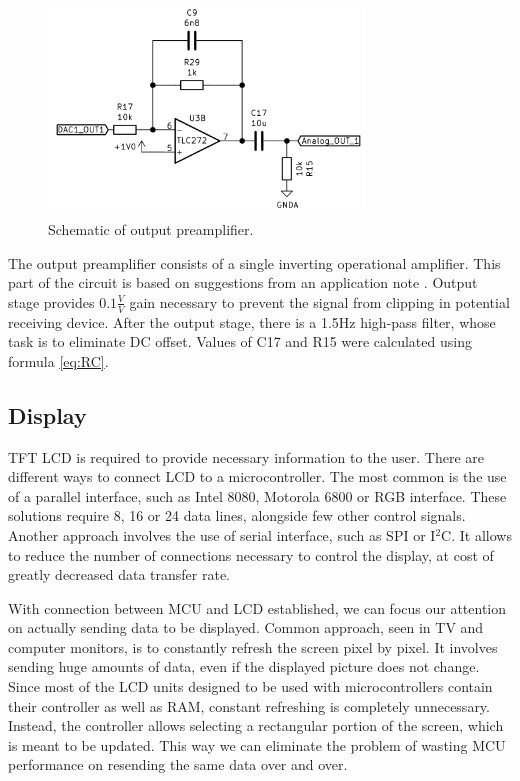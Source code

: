 \documentclass[a4paper,twoside,12pt]{book}
\begin{document}
\begin{figure}[H]
    \centering
    \includegraphics[width=0.75\textwidth]{images/Output_preamp}
    \caption{Schematic of output preamplifier.}
    \label{fig:output}
\end{figure}

The output preamplifier consists of a single inverting operational amplifier.
This part of the circuit is based on suggestions from 
an application note \cite{ST:DAC}.
Output stage provides \(0.1\frac{V}{V}\) gain necessary to prevent
the signal from clipping in potential receiving device.
After the output stage, there is a 1.5Hz high-pass filter,
whose task is to eliminate DC offset.
Values of C17 and R15 were calculated using formula \ref{eq:RC}.

\subsection{Display}
TFT LCD is required to provide necessary information to the user.
There are different ways to connect LCD to a microcontroller.
The most common is the use of a parallel interface,
such as Intel 8080, Motorola 6800 or RGB interface.
These solutions require 8, 16 or 24 data lines,
alongside few other control signals.
Another approach involves the use of serial interface,
such as SPI or I\(^2\)C.
It allows to reduce the number of connections necessary to control the display,
at cost of greatly decreased data transfer rate.

With connection between MCU and LCD established,
we can focus our attention on actually sending data to be displayed.
Common approach, seen in TV and computer monitors,
is to constantly refresh the screen pixel by pixel.
It involves sending huge amounts of data,
even if the displayed picture does not change.
Since most of the LCD units designed to be used with microcontrollers
contain their controller as well as RAM,
constant refreshing is completely unnecessary.
Instead, the controller allows selecting a rectangular portion
of the screen, which is meant to be updated.
This way we can eliminate the problem of wasting MCU performance
on resending the same data over and over.
\end{document}
